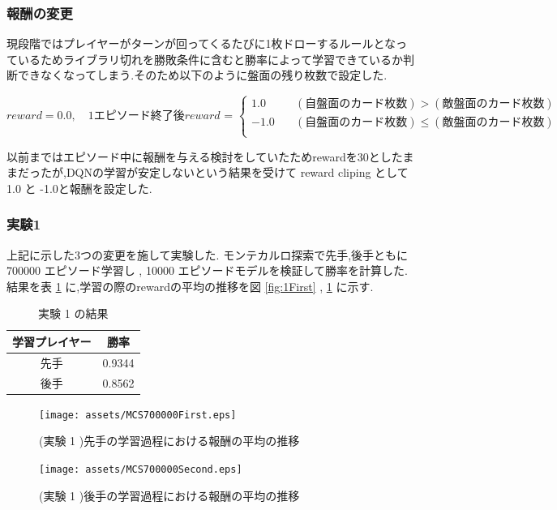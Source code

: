 \documentclass{jarticle}     %
\begin{document}
\subsubsection{報酬の変更}
現段階ではプレイヤーがターンが回ってくるたびに1枚ドローするルールとなっているためライブラリ切れを勝敗条件に含むと勝率によって学習できているか判断できなくなってしまう.そのため以下のように盤面の残り枚数で設定した.

\begin{equation*}
  reward = 0.0,
  \quad 
  \mathrm{1 エピソード終了後}
  reward \text{ = }
  \left\{
    \begin{aligned}
        1.0 \quad &(自盤面のカード枚数) > (敵盤面のカード枚数) \\
        -1.0 \quad  &(自盤面のカード枚数) \leq (敵盤面のカード枚数)\\
    \end{aligned}
    \right.
\end{equation*}

以前まではエピソード中に報酬を与える検討をしていたためrewardを30としたままだったが,DQNの学習が安定しないという結果を受けて reward cliping として 1.0 と -1.0と報酬を設定した.
\subsubsection{実験1}
上記に示した3つの変更を施して実験した.
モンテカルロ探索で先手,後手ともに 700000 エピソード学習し , 10000 エピソードモデルを検証して勝率を計算した.結果を表 \ref{table:jikken1} に,学習の際のrewardの平均の推移を図 \ref{fig:1First} , \ref{fig:1Second} に示す.

\begin{table}[H]
  \centering
  \caption{実験 1 の結果}
  \label{table:jikken1}
  \begin{tabular}{|c|c|}
  \hline
  学習プレイヤー & 勝率     \\ \hline
  先手      & 0.9344 \\ \hline
  後手      & 0.8562 \\ \hline
  \end{tabular}
  \end{table}

  \begin{figure}[htbp]
    \begin{minipage}[b]{0.52\linewidth}
      \centering
      \texttt{[image: assets/MCS700000First.eps]}
      \caption{(実験 1 )先手の学習過程における報酬の平均の推移}
      \label{fig:1First}
    \end{minipage}
    \begin{minipage}[b]{0.52\linewidth}
      \centering
      \texttt{[image: assets/MCS700000Second.eps]}
      \caption{(実験 1 )後手の学習過程における報酬の平均の推移}
      \label{fig:1Second}
    \end{minipage}
  \end{figure}
\end{document}
